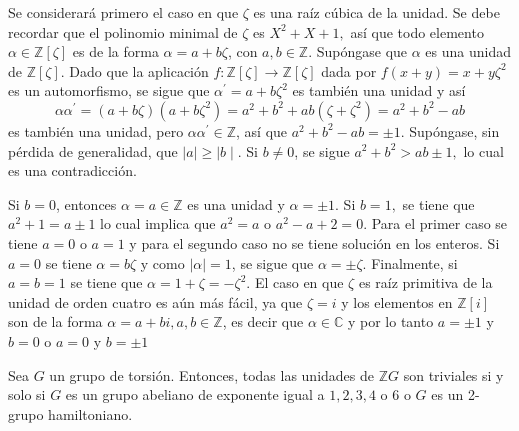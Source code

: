 \begin{proof*}
Se considerará primero el caso en que $\zeta$ es una raíz cúbica de la unidad. Se debe recordar que el polinomio minimal de $\zeta$ es $X^2 + X + 1,$ así que todo elemento $\alpha \in \mathds{Z}[\zeta]$ es de la forma $\alpha = a+b\zeta$, con $a,b \in \mathds{Z}$. Supóngase que $\alpha$ es una unidad de $\mathds{Z}[\zeta]$. Dado que la aplicación $f \colon \mathds{Z}[\zeta]\to \mathds{Z}[\zeta]$ dada por $f(x+y) = x+y\zeta^2$ es un automorfismo, se sigue que $\alpha^{'} = a + b\zeta^2$ es también una unidad y así \[ \alpha\alpha^{'} = (a + b\zeta)(a + b\zeta^2) = a^2 + b^2 + ab(\zeta  + \zeta^2) = a^2 + b^2 -ab \] es también una unidad, pero $\alpha\alpha^{'} \in \mathds{Z}$, así que $a^2 + b^2 -ab = \pm 1$. Supóngase, sin pérdida de generalidad, que $\mid a \mid \geq \mid b \mid$. Si $b \neq 0$, se sigue $a^2 + b^2 > ab \pm 1,$ lo cual es una contradicción. 

Si $b = 0$, entonces $\alpha = a \in \mathds{Z}$ es una unidad y $\alpha = \pm 1$. Si $b = 1,$ se tiene que $a^2 + 1 = a \pm 1$ lo cual implica que $a^2 = a$ o  $a^2-a+2 = 0$. Para el primer caso se tiene $a = 0$  o $a=1$ y para el segundo caso no se tiene solución en los enteros. Si $a=0$ se tiene $\alpha = b\zeta$ y como $\mid \alpha \mid = 1$, se sigue que $\alpha = \pm \zeta$. Finalmente, si $a = b = 1$ se tiene que $\alpha =1 + \zeta = -\zeta^2$.
El caso en que $\zeta$ es raíz primitiva de la unidad de orden cuatro es aún más fácil, ya que $\zeta = i$ y los elementos en $\mathds{Z}[i]$ son de la forma $\alpha = a + bi, a,b \in \mathds{Z}$, es decir que $\alpha \in \mathds{C}$ y por lo tanto $a = \pm 1$ y $b = 0$ o $a = 0$ y $b = \pm 1$
\end{proof*}
\begin{teorema}[Higman]\label{teo:Higman}
Sea $G$ un grupo de torsión. Entonces, todas las unidades de $\mathds{Z}G$ son triviales si y solo si $G$ es un grupo abeliano de exponente igual a $1,2,3,4$ o $6$ o $G$ es un 2-grupo hamiltoniano. 
\end{teorema}
